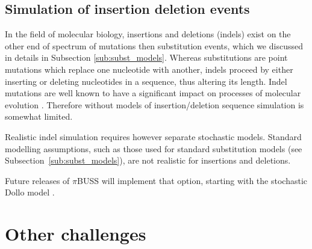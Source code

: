\subsection{Simulation of insertion deletion events}

In the field of molecular biology, insertions and deletions (indels) exist on the other end of spectrum of mutations then substitution events, which we discussed in details in Subsection \ref{sub:subst_models}.
Whereas substitutions are point mutations which replace one nucleotide with another, indels proceed by either inserting or deleting nucleotides in a sequence, thus altering its length. 
Indel mutations are well known to have a significant impact on processes of molecular evolution \citep{Fletcher2009}. 
Therefore without models of insertion/deletion sequence simulation is somewhat limited.






Realistic indel simulation requires however separate stochastic models.
Standard modelling assumptions, such as those used for standard substitution models (see Subsection~\ref{sub:subst_models}), are not realistic for insertions and deletions.


Future releases of $\pi$BUSS will implement that option, starting with the stochastic Dollo model \citep{LeQuesne1974}.




















\section{Other challenges}

